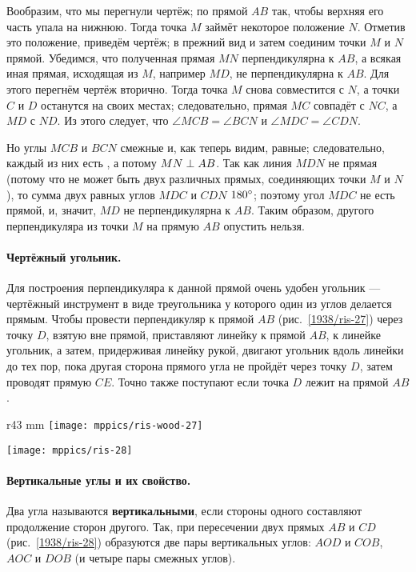Вообразим, что мы перегнули чертёж;
по прямой $AB$ так, чтобы верхняя его часть упала на нижнюю.
Тогда точка $M$ займёт некоторое положение $N$.
Отметив это положение, приведём чертёж;
в прежний вид и затем соединим точки $M$ и $N$ прямой.
Убедимся, что полученная прямая $MN$ перпендикулярна к $AB$, а всякая иная прямая, исходящая из $M$, например $MD$, не перпендикулярна к $AB$.
Для этого перегнём чертёж вторично.
Тогда точка $M$ снова совместится с $N$, а точки $C$ и $D$ останутся на своих местах;
следовательно, прямая $MC$ совпадёт с $NC$, а $MD$ с $ND$.
Из этого следует, что $\angle MCB = \angle BCN$ и $\angle MDC = \angle CDN$.

Но углы $MCB$ и $BCN$ смежные и, как теперь видим, равные;
следовательно, каждый из них есть , а потому $MN\z\perp AB$.
Так как линия $MDN$ не прямая (потому что не может быть двух различных прямых, соединяющих точки $M$ и $N$), то сумма двух равных углов $MDC$ и $CDN$  $180\degree$;
поэтому угол $MDC$ не есть прямой, и, значит, $MD$ не перпендикулярна к $AB$.
Таким образом, другого перпендикуляра из точки $M$ на прямую $AB$ опустить нельзя.

\paragraph{Чертёжный угольник.}\label{1938/25} 
Для построения перпендикуляра к данной прямой очень удобен угольник — чертёжный инструмент в виде треугольника у которого один из углов делается прямым.
Чтобы провести перпендикуляр к прямой $AB$ (рис.~\ref{1938/ris-27}) через точку $D$, взятую вне прямой, приставляют линейку к прямой $AB$, к линейке угольник, а затем, придерживая линейку рукой, двигают угольник вдоль линейки до тех пор, пока другая сторона прямого угла не пройдёт через точку $D$, затем проводят прямую $CE$.
Точно также поступают если точка $D$ лежит на прямой $AB$.

\begin{wrapfigure}[19]{r}{43 mm}
\centering
\texttt{[image: mppics/ris-wood-27]}
\caption{}\label{1938/ris-27}
\bigskip
\texttt{[image: mppics/ris-28]}
\caption{}\label{1938/ris-28}
\end{wrapfigure}

\paragraph{Вертикальные углы и их свойство.}\label{1938/26}
Два угла называются \textbf{вертикальными}, если стороны одного составляют продолжение сторон другого.
Так, при пересечении двух прямых $AB$ и $CD$ (рис.~\ref{1938/ris-28}) образуются две пары вертикальных углов:
$AOD$ и $COB$, $AOC$ и $DOB$ (и четыре пары смежных углов).


